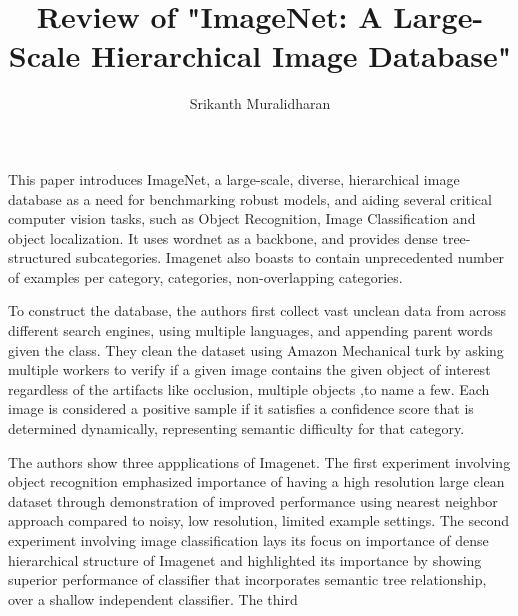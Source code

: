 \documentclass[]{article}
\title{Review of "ImageNet: A Large-Scale Hierarchical Image Database"}
\author{Srikanth Muralidharan}
\begin{document}
\maketitle

This paper introduces ImageNet, a large-scale, diverse, hierarchical image database as a need for benchmarking robust models, and aiding several critical computer vision tasks, 
such as Object Recognition, Image Classification and object localization. It uses wordnet as a backbone, and provides dense
tree-structured subcategories. Imagenet also boasts to contain unprecedented number of examples per category, categories,
non-overlapping categories.
\par
To construct the database, the authors first collect vast unclean data from across different search engines, using multiple
languages, and appending parent words given the class. They clean the dataset using Amazon Mechanical turk by
asking multiple workers to verify if a given image contains the given object of interest regardless of the artifacts like occlusion,
multiple objects ,to name a few. Each image is considered a positive sample if it satisfies a confidence score that is determined
dynamically, representing semantic difficulty for that category.
\par
The authors show three appplications of Imagenet. The first experiment involving object recognition emphasized importance
of having a high resolution large clean dataset through demonstration of improved performance using nearest neighbor approach
compared to noisy, low resolution, limited example settings. The second experiment involving image classification lays its
focus on importance of dense hierarchical structure of Imagenet and highlighted its importance by showing superior performance
of classifier that incorporates semantic tree relationship, over a shallow independent classifier. The third 
\end{document}

